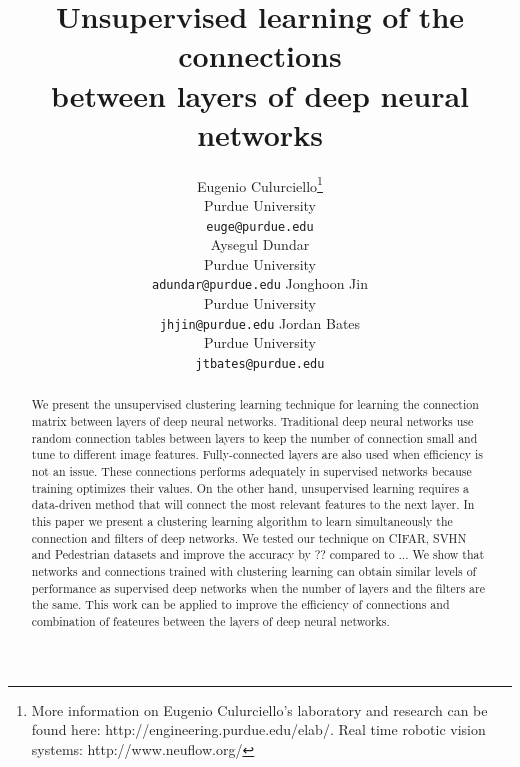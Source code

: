 \documentclass{article} %
\begin{document}
\title{Unsupervised learning of the connections  \\ between layers of deep neural networks}

\author{
Eugenio Culurciello\thanks{More information on Eugenio Culurciello's laboratory and research can be found here: http://engineering.purdue.edu/elab/. Real time robotic vision systems: http://www.neuflow.org/} \\
Purdue University\\
\texttt{euge@purdue.edu} \\
\And
Aysegul Dundar \\
Purdue University\\
\texttt{adundar@purdue.edu}
\AND
Jonghoon Jin \\
Purdue University\\
\texttt{jhjin@purdue.edu}
\And
Jordan Bates \\
Purdue University\\
\texttt{jtbates@purdue.edu}
}


\maketitle

\begin{abstract}
We present the unsupervised clustering learning technique for learning the connection matrix between layers of deep neural networks. Traditional deep neural networks  use random connection tables between layers to keep the number of  connection small and tune to different image features. Fully-connected layers are also used when efficiency is not an issue. These connections performs adequately in supervised networks because training optimizes their values. 
On the other hand, unsupervised learning requires a data-driven method that will connect the most relevant features to the next layer. In this paper we present a clustering learning algorithm to learn simultaneously the connection and filters of deep networks. We tested our technique on CIFAR, SVHN and Pedestrian datasets and improve the accuracy by ?? compared to ... We show that networks and connections trained with clustering learning can obtain similar levels of performance as supervised deep networks when the number of layers and the filters are the same. 
This work can be applied to improve the efficiency of connections and combination of feateures between the layers of deep neural networks.
\end{abstract}
\end{document}
